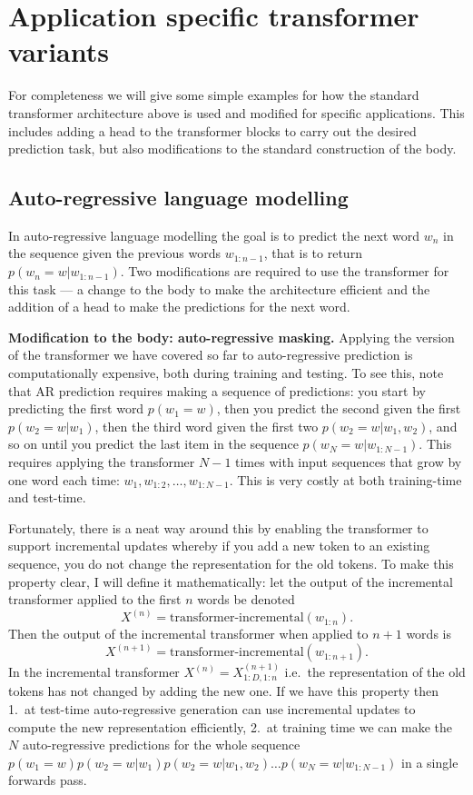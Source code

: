 \documentclass{article}
\begin{document}
\section{Application specific transformer variants} \label{sec:head}
%
For completeness we will give some simple examples for how the standard transformer architecture above is used and modified for specific applications. This includes adding a head to the transformer blocks to carry out the desired prediction task, but also modifications to the standard construction of the body.

\subsection{Auto-regressive language modelling}

In auto-regressive language modelling  the goal is to predict the next word $w_n$ in the sequence given the previous words $w_{1:n-1}$, that is to return $p(w_n = w | w_{1:n-1})$. Two modifications are required to use the transformer for this task --- a change to the body to make the architecture efficient and the addition of a head to make the predictions for the next word.

\textbf{Modification to the body: auto-regressive masking.} Applying the version of the transformer we have covered so far to auto-regressive prediction is computationally expensive, both during training and testing. To see this, note that AR prediction requires making a sequence of predictions: you start by predicting the first word $p(w_1 = w)$, then you predict the second given the first $ p(w_2 = w | w_{1})$, then the third word given the first two $ p(w_2 = w | w_{1},w_2)$, and so on until you predict the last item in the sequence $p(w_N = w | w_{1:N-1})$. This requires applying the transformer $N-1$ times with input sequences that grow by one word each time: ${w_1,w_{1:2},\hdots,w_{1:N-1}}$. This is very costly at both training-time and test-time. 

Fortunately, there is a neat way around this by enabling the transformer to support incremental updates whereby if you add a new token to an existing sequence, you do not change the representation for the old tokens. To make this property clear, I will define it mathematically: let the output of the incremental transformer applied to the first $n$ words be denoted
\[
X^{(n)} = \text{transformer-incremental}(w_{1:n}).
\]
Then the output of the incremental transformer when applied to $n+1$ words is
\[
X^{(n+1)} = \text{transformer-incremental}(w_{1:n+1}).
\]
%
In the incremental transformer $X^{(n)} = X^{(n+1)}_{1:D,1:n}$ i.e.~the representation of the old tokens has not changed by adding the new one. If we have this property then 1.~at test-time auto-regressive generation can use incremental updates to compute the new representation efficiently, 2.~at training time we can make the $N$ auto-regressive predictions for the whole sequence $p(w_1 = w) p(w_2 = w | w_{1}) p(w_2 = w | w_{1},w_2) \hdots p(w_N = w | w_{1:N-1})$ in a single forwards pass.
\end{document}
